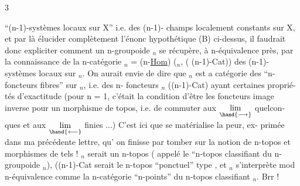  \hfill 3

``(n-1)-systèmes locaux sur X'' i.e. des (n-1)- champs localement constants
sur X, et par là élucider complètement l'énonc hypothétique (B) ci-dessus,
il faudrait donc expliciter comment un n-groupoide $_n$ se récupère, à
n-équivalence près, par la connaissance de la n-catégorie
$_n$ = (n-\underline{Hom}) ($_n$, ( (n-1)-Cat)) des (n-1)- systèmes locaux sur $_n$. On
aurait envie de dire que $_n$ est a catégorie des ``n-foncteurs fibres'' sur
$_n$, i.e. des n- foncteurs $_n$ \hand{$\longrightarrow$}((n-1)-Cat) ayant certaines proprié-%
tés d'exactitude (pour n = 1, c'était la condition d'être les foncteurs
image inverse pour un morphisme de topos, i.e. de commuter aux $\underset{\hand{\longrightarrow}}{\mathrm{lim}}$ quelcon-%
ques et aux $\underset{\hand{\longleftarrow}}{\mathrm{lim}}$ finies ...) C'est ici que se matérialise la peur, ex-%
primée dans ma précédente lettre, qu' on finisse par tomber sur la notion
de n-topos et morphismes de tels ! $_n$ serait un n-topos\hand{,} ( appelé
le ``n-topos classifiant du n-groupoide $_n$), ((n-1)-Cat serait le
n-topos ``ponctuel'' type , et $_n$ s'interprète mod n-équivalence
comme la n-catégorie  ``n-points'' du n-topos classifiant $_n$. Brr !

